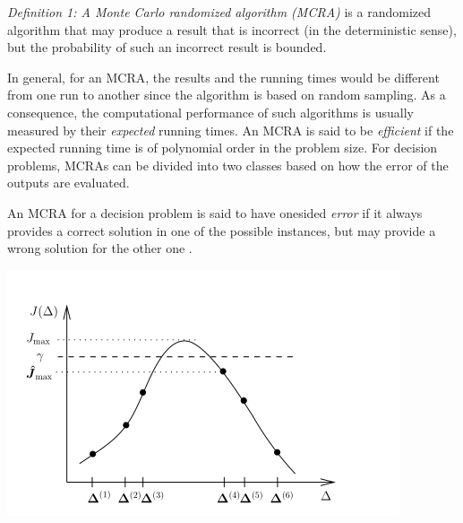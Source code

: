 \documentclass[12pt]{article}
\begin{document}
		\textit{Definition 1: A Monte Carlo randomized algorithm (MCRA)} is a randomized algorithm that may produce a result that is incorrect (in the deterministic sense), but the probability of such an incorrect result is bounded.
		\par
		In general, for an MCRA, the results and the running times would be different from one run to another since the algorithm is based on random sampling. As a consequence, the computational performance of such algorithms is usually measured by their 
		\textit{expected} running times. An MCRA is said to be 
		\textit{efficient} if the expected running time is of polynomial order in the problem size.
		For decision problems, MCRAs can be divided into two classes based on how the error of the outputs are evaluated.
		\par
		An MCRA for a decision problem is said to have onesided 
		\textit{error} if it always provides a correct solution in one of the possible instances, but may provide a wrong solution for the other one \cite{bib17}.
		\par
		
		\begin{center}
			\includegraphics[width=0.49\linewidth]{1.png}
		\end{center}
		
\end{document}
